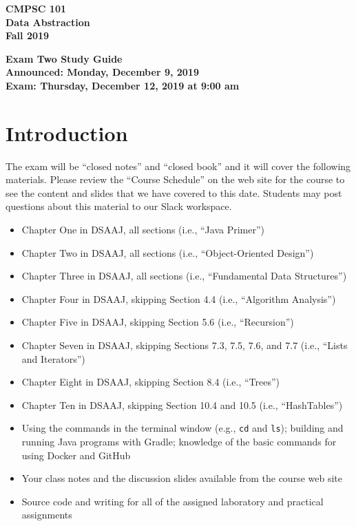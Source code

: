 \documentclass[11pt]{article}
\newcommand{\assignmentduedate}{December 12}
\newcommand{\assignmentassignedate}{December 9}
\newcommand{\assignmentnumber}{Two}
\newcommand{\labyear}{2019}
\newcommand{\assignedday}{Monday}
\newcommand{\dueday}{Thursday}
\newcommand{\labtime}{9:00 am}
\newcommand{\assigneddate}{Announced: \assignedday, \assignmentassignedate, \labyear{}}
\newcommand{\duedate}{Exam: \dueday, \assignmentduedate, \labyear{} at \labtime{}}
\newcommand{\program}[1]{\lstinline{#1}}
\newcommand{\guidetitle}[1]
{
  \begin{center}
    \begin{center}
      \bf
      CMPSC 101\\Data Abstraction\\
      Fall 2019\\
      \medskip
    \end{center}
    \bf
    #1
  \end{center}
}
\begin{document}
\thispagestyle{empty}

\guidetitle{Exam \assignmentnumber{} Study Guide \\ \assigneddate{} \\ \duedate{}}

\section*{Introduction}

\noindent
The exam will be ``closed notes'' and ``closed book'' and it will cover the
following materials. Please review the ``Course Schedule'' on the web site for
the course to see the content and slides that we have covered to this date.
Students may post questions about this material to our Slack workspace.

\begin{itemize}

  \itemsep 0in

  \item Chapter One in DSAAJ, all sections (i.e., ``Java Primer'')

  \item Chapter Two in DSAAJ, all sections (i.e., ``Object-Oriented Design'')

  \item Chapter Three in DSAAJ, all sections (i.e., ``Fundamental Data Structures'')

  \item Chapter Four in DSAAJ, skipping Section 4.4 (i.e., ``Algorithm Analysis'')

  \item Chapter Five in DSAAJ, skipping Section 5.6 (i.e., ``Recursion'')

  \item Chapter Seven in DSAAJ, skipping Sections 7.3, 7.5, 7.6, and 7.7 (i.e.,
    ``Lists and Iterators'')

  \item Chapter Eight in DSAAJ, skipping Section 8.4 (i.e., ``Trees'')

  \item Chapter Ten in DSAAJ, skipping Section 10.4 and 10.5 (i.e., ``HashTables'')

  \item Using the commands in the terminal window (e.g., \program{cd} and
    \program{ls}); building and running Java programs with Gradle; knowledge of
    the basic commands for using Docker and GitHub

  \item Your class notes and the discussion slides available from the course web
    site

  \item Source code and writing for all of the assigned laboratory and practical
    assignments

\end{itemize}
\end{document}
